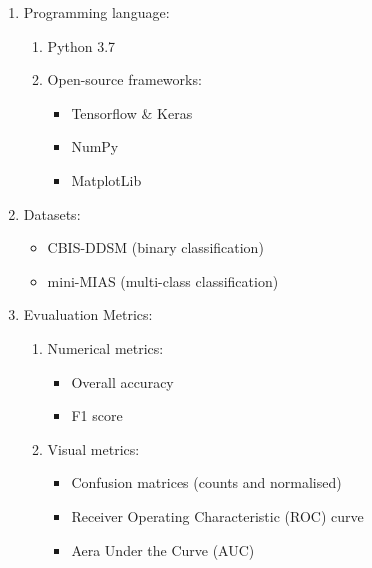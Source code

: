 \begin{enumerate}
    \item Programming language:
    \begin{enumerate}
        \item Python 3.7
        \item Open-source frameworks:
        \begin{itemize}
            \item Tensorflow \& Keras
            \item NumPy
            \item MatplotLib
        \end{itemize}
    \end{enumerate} 
    
    \item Datasets:
    \begin{itemize}
        \item CBIS-DDSM (binary classification)
        \item mini-MIAS (multi-class classification)
    \end{itemize}
    
    \item Evualuation Metrics:
    \begin{enumerate}
        \item Numerical metrics:
        \begin{itemize}
            \item Overall accuracy
            \item F1 score
        \end{itemize}
        \item Visual metrics:
        \begin{itemize}
            \item Confusion matrices (counts and normalised)
            \item Receiver Operating Characteristic (ROC) curve
            \item Aera Under the Curve (AUC)
    \end{itemize}
    \end{enumerate}
    
\end{enumerate}
